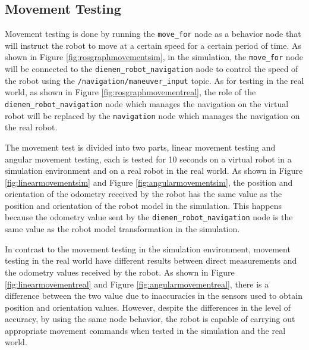 \subsection{Movement Testing}
\label{subsec:movementtesting}




Movement testing is done by running the \lstinline{move_for} node as a behavior node that will instruct the robot to move at a certain speed for a certain period of time.
As shown in Figure \ref{fig:rosgraphmovementsim},
  in the simulation,
  the \lstinline{move_for} node will be connected to the \lstinline{dienen_robot_navigation} node to control the speed of the robot using the \lstinline{/navigation/maneuver_input} topic.
As for testing in the real world, as shown in Figure \ref{fig:rosgraphmovementreal},
  the role of the \lstinline{dienen_robot_navigation} node which manages the navigation on the virtual robot will be replaced by the \lstinline{navigation} node which manages the navigation on the real robot.




The movement test is divided into two parts,
  linear movement testing and angular movement testing,
  each is tested for 10 seconds on a virtual robot in a simulation environment and on a real robot in the real world.
As shown in Figure \ref{fig:linearmovementsim} and Figure \ref{fig:angularmovementsim},
  the position and orientation of the odometry received by the robot has the same value as the position and orientation of the robot model in the simulation.
This happens because the odometry value sent by the \lstinline{dienen_robot_navigation} node is the same value as the robot model transformation in the simulation.




In contrast to the movement testing in the simulation environment,
  movement testing in the real world have different results between direct measurements and the odometry values received by the robot.
As shown in Figure \ref{fig:linearmovementreal} and Figure \ref{fig:angularmovementreal},
  there is a difference between the two value due to inaccuracies in the sensors used to obtain position and orientation values.
However, despite the differences in the level of accuracy, by using the same node behavior,
  the robot is capable of carrying out appropriate movement commands when tested in the simulation and the real world.
